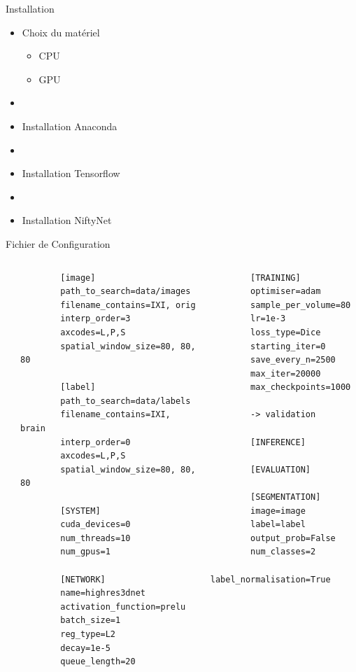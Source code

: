 \documentclass{beamer}
\begin{document}
\begin{frame}{Installation}
  \begin{itemize}
    \item Choix du matériel
    \begin{itemize}
      \item CPU
      \item GPU
    \end{itemize}
    \item[]
    \item Installation Anaconda
    \item[]
    \item Installation Tensorflow
    \item[]
    \item Installation NiftyNet
  \end{itemize}
\end{frame}

\begin{frame}[t, fragile]{Fichier de Configuration}
  \tiny
  \begin{columns}
    \begin{column}{0.01\textwidth}

    \end{column}
    \begin{column}{0.5\textwidth}
      \begin{verbatim}
        [image]
        path_to_search=data/images
        filename_contains=IXI, orig
        interp_order=3
        axcodes=L,P,S
        spatial_window_size=80, 80, 80

        [label]
        path_to_search=data/labels
        filename_contains=IXI, brain
        interp_order=0
        axcodes=L,P,S
        spatial_window_size=80, 80, 80

        [SYSTEM]
        cuda_devices=0
        num_threads=10
        num_gpus=1

        [NETWORK]
        name=highres3dnet
        activation_function=prelu
        batch_size=1
        reg_type=L2
        decay=1e-5
        queue_length=20
      \end{verbatim}
    \end{column}
    \begin{column}{0.5\textwidth}
      \begin{verbatim}
        [TRAINING]
        optimiser=adam
        sample_per_volume=80
        lr=1e-3
        loss_type=Dice
        starting_iter=0
        save_every_n=2500
        max_iter=20000
        max_checkpoints=1000

        -> validation

        [INFERENCE]

        [EVALUATION]

        [SEGMENTATION]
        image=image
        label=label
        output_prob=False
        num_classes=2
        label_normalisation=True
      \end{verbatim}
    \end{column}
  \end{columns}
\end{frame}
\end{document}
